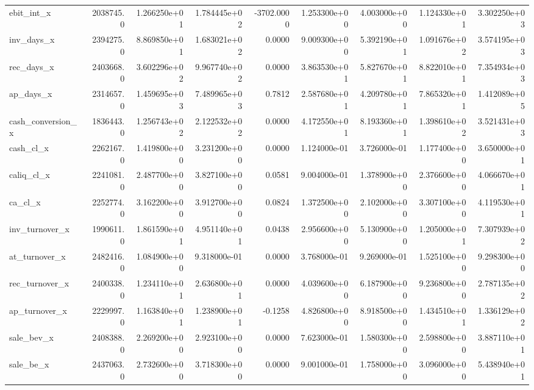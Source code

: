 \documentclass[12pt]{article}
\begin{document}
\begin{landscape}
\begin{longtable}{|l|r|r|r|r|r|r|r|r|}
ebit\_int\_x              &  2038745.0 &  1.266250e+01 &  1.784445e+02 &  -3702.0000 &  1.253300e+00 &  4.003000e+00 &  1.124330e+01 &  3.302250e+03 \\
inv\_days\_x              &  2394275.0 &  8.869850e+01 &  1.683021e+02 &      0.0000 &  9.009300e+00 &  5.392190e+01 &  1.091676e+02 &  3.574195e+03 \\
rec\_days\_x              &  2403668.0 &  3.602296e+02 &  9.967740e+02 &      0.0000 &  3.863530e+01 &  5.827670e+01 &  8.822010e+01 &  7.354934e+03 \\
ap\_days\_x               &  2314657.0 &  1.459695e+03 &  7.489965e+03 &      0.7812 &  2.587680e+01 &  4.209780e+01 &  7.865320e+01 &  1.412089e+05 \\
cash\_conversion\_x       &  1836443.0 &  1.256743e+02 &  2.122532e+02 &      0.0000 &  4.172550e+01 &  8.193360e+01 &  1.398610e+02 &  3.521431e+03 \\
cash\_cl\_x               &  2262167.0 &  1.419800e+00 &  3.231200e+00 &      0.0000 &  1.124000e-01 &  3.726000e-01 &  1.177400e+00 &  3.650000e+01 \\
caliq\_cl\_x              &  2241081.0 &  2.487700e+00 &  3.827100e+00 &      0.0581 &  9.004000e-01 &  1.378900e+00 &  2.376600e+00 &  4.066670e+01 \\
ca\_cl\_x                 &  2252774.0 &  3.162200e+00 &  3.912700e+00 &      0.0824 &  1.372500e+00 &  2.102000e+00 &  3.307100e+00 &  4.119530e+01 \\
inv\_turnover\_x          &  1990611.0 &  1.861590e+01 &  4.951140e+01 &      0.0438 &  2.956600e+00 &  5.130900e+00 &  1.205000e+01 &  7.307939e+02 \\
at\_turnover\_x           &  2482416.0 &  1.084900e+00 &  9.318000e-01 &      0.0000 &  3.768000e-01 &  9.269000e-01 &  1.525100e+00 &  9.298300e+00 \\
rec\_turnover\_x          &  2400338.0 &  1.234110e+01 &  2.636800e+01 &      0.0000 &  4.039600e+00 &  6.187900e+00 &  9.236800e+00 &  2.787135e+02 \\
ap\_turnover\_x           &  2229997.0 &  1.163840e+01 &  1.238900e+01 &     -0.1258 &  4.826800e+00 &  8.918500e+00 &  1.434510e+01 &  1.336129e+02 \\
sale\_bev\_x              &  2408388.0 &  2.269200e+00 &  2.923100e+00 &      0.0000 &  7.623000e-01 &  1.580300e+00 &  2.598800e+00 &  3.887110e+01 \\
sale\_be\_x               &  2437063.0 &  2.732600e+00 &  3.718300e+00 &      0.0000 &  9.001000e-01 &  1.758000e+00 &  3.096000e+00 &  5.438940e+01 \\

\end{longtable}
\end{landscape}
\end{document}
